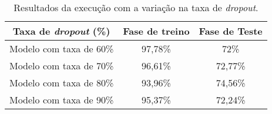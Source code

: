 \begin{table}[H]
    \centering
    \caption{Resultados da execução com a variação na taxa de \textit{dropout}.
    \label{tab:resultado3}}
    \begin{tabular}{ccc}
        \toprule
             Taxa de \textit{dropout} (\%) & Fase de treino & Fase de Teste \\
        \midrule
            Modelo com taxa de 60\% & 97,78\% & 72\%  \\
            Modelo com taxa de 70\% & 96,61\% & 72,77\%  \\
            Modelo com taxa de 80\% & 93,96\% & 74,56\%  \\
            Modelo com taxa de 90\% & 95,37\% & 72,24\%  \\
        \bottomrule
    \end{tabular}
\end{table}
